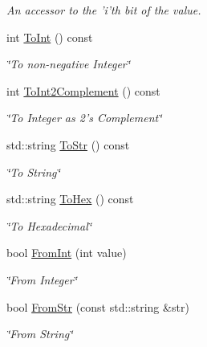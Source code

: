 \begin{DoxyCompactItemize}
\begin{DoxyCompactList}\small\item\em An accessor to the 'i'th bit of the value. \item\end{DoxyCompactList}\item 
int \hyperlink{classWord_acf9a6c3d9cf07d66da592ec76f572464}{ToInt} () const 
\begin{DoxyCompactList}\small\item\em \char`\"{}To non-\/negative Integer\char`\"{} \item\end{DoxyCompactList}\item 
int \hyperlink{classWord_a4116e08d36472a287c06a4aa14e7ed4f}{ToInt2Complement} () const 
\begin{DoxyCompactList}\small\item\em \char`\"{}To Integer as 2's Complement\char`\"{} \item\end{DoxyCompactList}\item 
std::string \hyperlink{classWord_a5f8c5dcdb847ed96021ef9282ccc7e76}{ToStr} () const 
\begin{DoxyCompactList}\small\item\em \char`\"{}To String\char`\"{} \item\end{DoxyCompactList}\item 
std::string \hyperlink{classWord_af71af6fa290db8e9b4719c2b95ba9af0}{ToHex} () const 
\begin{DoxyCompactList}\small\item\em \char`\"{}To Hexadecimal\char`\"{} \item\end{DoxyCompactList}\item 
bool \hyperlink{classWord_aed80a61d7e2da2dbcde483058acd4259}{FromInt} (int value)
\begin{DoxyCompactList}\small\item\em \char`\"{}From Integer\char`\"{} \item\end{DoxyCompactList}\item 
bool \hyperlink{classWord_a0b255da1e924b2ab520cc5ca271bacf0}{FromStr} (const std::string \&str)
\begin{DoxyCompactList}\small\item\em \char`\"{}From String\char`\"{} \item\end{DoxyCompactList}\item 

\end{DoxyCompactItemize}
